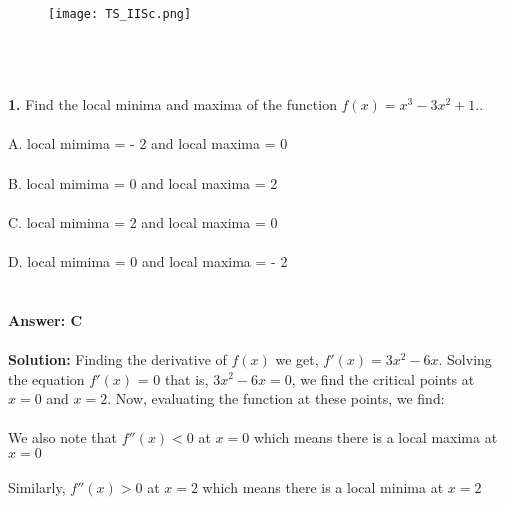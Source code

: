 \documentclass[prl,twocolumn,showpacs,preprintnumbers,superscriptaddress]{revtex4}
\theoremstyle{plain}
\theoremstyle{definition}
\begin{document}
\begin{widetext}
\\
\\
\\

\begin{wrapfigure}
\centering
\end{wrapfigure}
\begin{figure}[h!]
 \begin{right}
  \hfill\texttt{[image: TS\_IISc.png]}
 \end{right}
\end{figure}
\\
\\
\\
\noindent\textbf{1.} Find the local minima and maxima of the function $f(x) = x^3 - 3x^2 + 1.$.
\\
\\
\noindent A. local mimima = - 2 and local maxima = 0\\
\\
B. local mimima = 0 and local maxima = 2\\
\\
C. local mimima = 2 and local maxima = 0\\
\\
D. local mimima = 0 and local maxima = - 2
\\
\\
\\
\textbf{Answer: C}
\\
\\
\textbf{Solution:}
Finding the derivative of $f(x)$ we get, $f'(x) = 3x^2 - 6x$. Solving the equation $f'(x)$ = 0 that is, $3x^2 - 6x= 0$, we find the critical points at
$x = 0$ and $x = 2$. Now, evaluating the function at these points, we find:
\\
\\
We also note that $f''(x) < 0$ at $x = 0$ which means there is a local maxima at $x = 0$
\\
\\
Similarly, $f''(x) > 0$ at $x = 2$ which means there is a local minima at $x = 2$
\\
\\

\end{widetext}
\end{document}
